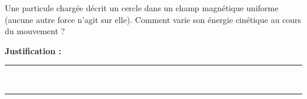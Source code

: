 Une particule chargée décrit un cercle dans un champ magnétique uniforme (aucune autre force n'agit sur elle). Comment varie son énergie cinétique au cours du mouvement ?

\choices

\noindent\textbf{Justification :} \hrulefill \\[2.5ex]
\rule{\linewidth}{0.4pt} \\[2.5ex]
\rule{\linewidth}{0.4pt}
\vfill
